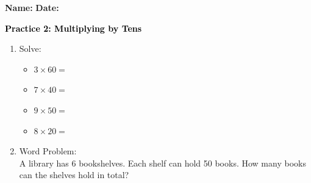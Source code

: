 \documentclass[12pt, letterpaper, fleqn]{article}
\newcommand{\blank}{\underline{\hspace{2.2cm}}}
\begin{document}
\textbf{Name:} \underline{\hspace{5cm}}
\hfill
\textbf{Date:} \underline{\hspace{3cm}}\\

\begin{tcolorbox}[colback=customteal!20]
    \large\textcolor{black}{\textbf{Practice 2: Multiplying by Tens}}
\end{tcolorbox}

\vspace{5mm}
\begin{enumerate}[itemsep=2.5cm, leftmargin=0.6cm]
\item Solve:
  \begin{itemize}[itemsep=0.8cm]
    \item $3 \times 60 =$ \blank
    \item $7 \times 40 =$ \blank
    \item $9 \times 50 =$ \blank
    \item $8 \times 20 =$ \blank
  \end{itemize}

\item Word Problem:
\\
A library has 6 bookshelves. Each shelf can hold 50 books. How many books can the shelves hold in total?
\end{enumerate}
\end{document}
